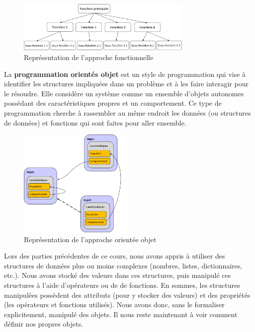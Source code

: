 \documentclass[12pt, a4paper]{article}
\begin{document}
\begin{figure}[H]
	\center \includegraphics[width=0.75\textwidth]{img/approche_fonctionnelle.png}
	\caption{Représentation de l'approche fonctionnelle}
	\label{fig:approche_fonctionnelle}
\end{figure}


La \textbf{programmation orientés objet} est un style de programmation qui vise à identifier les structures impliquées dans un problème et à les faire interagir pour le résoudre. Elle considère un système comme un ensemble d'objets autonomes possédant des caractéristiques propres et un comportement. Ce type de programmation cherche à rassembler au même endroit les données (ou structures de données) et fonctions qui sont faites pour aller ensemble.

\begin{figure}[H]
	\center \includegraphics[width=0.5\textwidth]{img/approche_objet.png}
	\caption{Représentation de l'approche orientée objet}
	\label{fig:approche_objet}
\end{figure}

Lors des parties précédentes de ce cours, nous avons appris à utiliser des structures de données plus ou moins complexes (nombres, listes, dictionnaires, etc.). Nous avons stocké des valeurs dans ces structures, puis manipulé ces structures à l'aide d'opérateurs ou de de fonctions. En sommes, les structures manipulées possèdent des attributs (pour y stocker des valeurs) et des propriétés (les opérateurs et fonctions utilisés). Nous avons donc, sans le formaliser explicitement, manipulé des objets. Il nous reste maintenant à voir comment définir nos propres objets.
\end{document}
